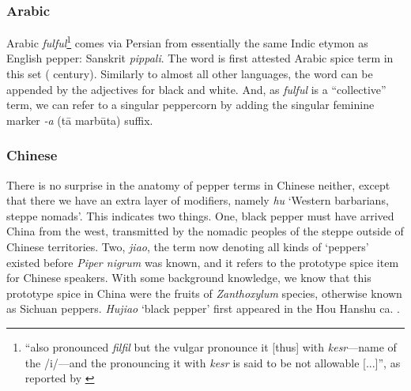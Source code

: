 

\subsubsection{Arabic}



Arabic \textit{fulful}\footnote{``also pronounced \textit{filfil} but the vulgar pronounce it [thus] with \textit{kesr}---name of the /i/---and the pronouncing it with \textit{kesr} is said to be not allowable [...]'', as reported by \textcite[2434]{lane_arabic-english_1863}} comes via Persian from essentially the same Indic etymon as English pepper: Sanskrit \textit{pippali}. The word is first attested Arabic spice term in this set (\AD {} century). Similarly to almost all other languages, the word can be appended by the adjectives for black and white. And, as \textit{fulful} is a ``collective'' term, we can refer to a singular peppercorn by adding the singular feminine marker \textit{-a} (t\={a} marb\={u}ta) suffix.







\subsubsection{Chinese}



There is no surprise in the anatomy of pepper terms in Chinese neither, except that there we have an extra layer of modifiers, namely \textit{hu} `Western barbarians, steppe nomads'. This indicates two things. One, black pepper must have arrived China from the west, transmitted by the nomadic peoples of the steppe outside of Chinese territories. Two, \textit{jiao}, the term now denoting all kinds of `peppers' existed before \textit{Piper nigrum} was known, and it refers to the prototype spice item for Chinese speakers. With some background knowledge, we know that this prototype spice in China were the fruits of \textit{Zanthoxylum} species, otherwise known as Sichuan peppers. \textit{Hujiao} `black pepper' first appeared in the \gls{Hou Hanshu} ca. .






